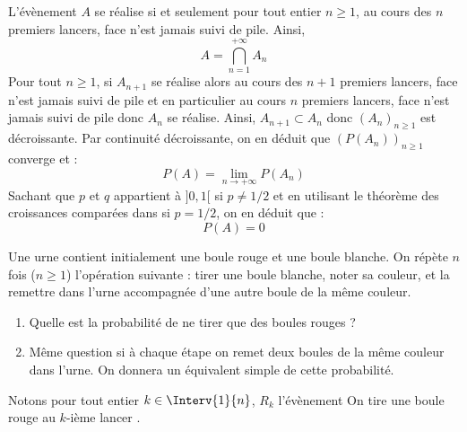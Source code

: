 \documentclass[a4paper,10pt]{report}
\begin{document}
\begin{enumerate}
\noindent L'évènement $A$ se réalise si et seulement pour tout entier $n \geq 1$, au cours des $n$ premiers lancers, face n'est jamais suivi de pile. Ainsi,
$$ A = \bigcap_{n=1}^{+ \infty} A_n$$
Pour tout $n \geq 1$, si $A_{n+1}$ se réalise alors au cours des $n+1$ premiers lancers, face n'est jamais suivi de pile et en particulier au cours $n$ premiers lancers, face n'est jamais suivi de pile donc $A_n$ se réalise. Ainsi, $A_{n+1} \subset A_n$ donc $(A_n)_{n \geq 1}$ est décroissante. Par continuité décroissante, on en déduit que $(P(A_n))_{n \geq 1}$ converge et :
$$ P(A) = \lim_{n \rightarrow + \infty} P(A_n)$$
Sachant que $p$ et $q$ appartient à $]0,1[$ si $p \neq 1/2$ et en utilisant le théorème des croissances comparées dans si $p=1/2$, on en déduit que :
$$ P(A)=0$$
\end{enumerate}

\begin{Exercice}{} Une urne contient initialement une boule rouge et une boule blanche. On répète $n$ fois ($n \geq 1$) l'opération suivante : tirer une boule blanche, noter sa couleur, et la remettre dans l'urne accompagnée d'une autre boule de la même couleur. 

\begin{enumerate}
\item Quelle est la probabilité de ne tirer que des boules rouges ?
\item Même question si à chaque étape on remet deux boules de la même couleur dans l'urne. On donnera un équivalent simple de cette probabilité.
\end{enumerate}
\end{Exercice} 

\corr Notons pour tout entier $k \in \Interv{1}{n}$, $R_k$ l'évènement \og On tire une boule rouge au $k$-ième lancer \fg.
\end{document}
